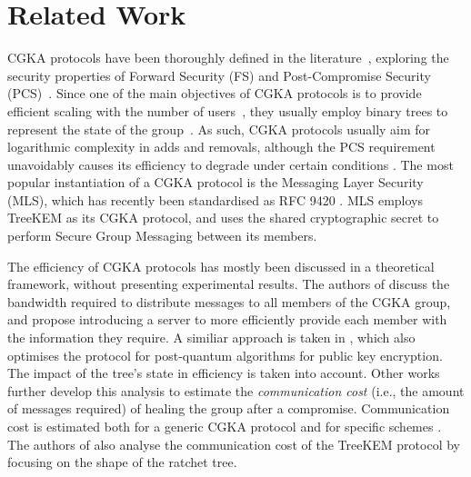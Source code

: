 \documentclass[preprint, 12pt]{elsarticle}
\begin{document}
\section{Related Work}
\label{sec:literature}

CGKA protocols have been thoroughly defined in the literature~\cite{cgka_analysis, itk, pass_continuous_2020}, exploring the security properties of Forward Security (FS) and Post-Compromise Security (PCS)~\cite{cgka_analysis}. Since one of the main objectives of CGKA protocols is to provide efficient  scaling with the number of users~\cite{bounds}, they usually employ binary trees to represent the state of the group~\cite{art, treekem, ttkem}. As such, CGKA protocols usually aim for logarithmic complexity in adds and removals, although the PCS requirement unavoidably causes its efficiency to degrade under certain conditions \cite{worst-case}. The most popular instantiation of a CGKA protocol is the Messaging Layer Security (MLS), which has recently been standardised as RFC 9420 \cite{mls}. MLS employs TreeKEM \cite{treekem} as its CGKA protocol, and uses the shared cryptographic secret to perform Secure Group Messaging between its members.  


The efficiency of CGKA protocols has mostly been discussed in a theoretical framework, without presenting experimental results. The authors of \cite{saik} discuss the bandwidth required to distribute messages to all members of the CGKA group, and propose introducing a server to more efficiently provide each member with the information they require. A similiar approach is taken in \cite{cmpke}, which also optimises the protocol for post-quantum algorithms for public key encryption. The impact of the tree's state in efficiency is taken into account. Other works further develop this analysis to estimate the \textit{communication cost} (i.e., the amount of messages required) of healing the group after a compromise. Communication cost is estimated both for a generic CGKA protocol \cite{cost_1, cost_2, bounds} and for specific schemes \cite{cocoa, qtk, cgka_fa}. The authors of \cite{cost_tree} also analyse the communication cost of the TreeKEM protocol by focusing on the shape of the ratchet tree.
\end{document}

